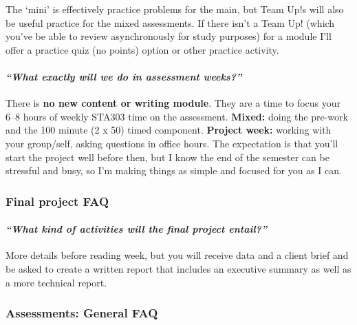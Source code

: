 \documentclass[
  openany]{book}
\begin{document}
The `mini' is effectively practice problems for the main, but Team Up!s will also be useful practice for the mixed assessments. If there isn't a Team Up! (which you've be able to review asynchronously for study purposes) for a module I'll offer a practice quiz (no points) option or other practice activity.

\hypertarget{what-exactly-will-we-do-in-assessment-weeks}{%
\paragraph{\texorpdfstring{\emph{``What exactly will we do in assessment weeks?''}}{``What exactly will we do in assessment weeks?''}}\label{what-exactly-will-we-do-in-assessment-weeks}}

There is \textbf{no new content or writing module}. They are a time to focus your 6--8 hours of weekly STA303 time on the assessment. \textbf{Mixed:} doing the pre-work and the 100 minute (2 x 50) timed component. \textbf{Project week:} working with your group/self, asking questions in office hours. The expectation is that you'll start the project well before then, but I know the end of the semester can be stressful and busy, so I'm making things as simple and focused for you as I can.

\hypertarget{final-project-faq}{%
\subsubsection{Final project FAQ}\label{final-project-faq}}

\hypertarget{what-kind-of-activities-will-the-final-project-entail}{%
\paragraph{\texorpdfstring{\emph{``What kind of activities will the final project entail?''}}{``What kind of activities will the final project entail?''}}\label{what-kind-of-activities-will-the-final-project-entail}}

More details before reading week, but you will receive data and a client brief and be asked to create a written report that includes an executive summary as well as a more technical report.

\hypertarget{assessments-general-faq}{%
\subsubsection{Assessments: General FAQ}\label{assessments-general-faq}}
\end{document}
